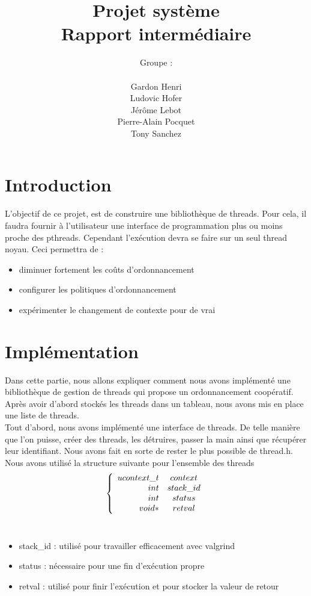 \documentclass{article}
\author{Groupe :\\ \\Gardon Henri\\Ludovic Hofer\\Jérôme Lebot\\Pierre-Alain Pocquet\\Tony Sanchez}
\title{Projet système \\ Rapport intermédiaire}
\begin{document}
\maketitle

\section*{Introduction}
 
 L'objectif de ce projet, est de construire une bibliothèque de threads. Pour
cela, il faudra fournir à l'utilisateur une interface de programmation plus ou
moins proche des pthreads.
 Cependant l'exécution devra se faire sur un seul thread noyau.
 Ceci permettra de :
 \\
 \begin{itemize}
 \item diminuer fortement les coûts d'ordonnancement
 \item configurer les politiques d'ordonnancement
 \item expérimenter le changement de contexte pour de vrai
 \end{itemize}

\section{Implémentation}
 
 	Dans cette partie, nous allons expliquer comment nous avons implémenté une
bibliothèque de gestion de threads qui propose un ordonnancement coopératif.
Après avoir d'abord stockés les threads dans un tableau, nous avons mis en place
une liste de threads.%
 \\
	Tout d'abord, nous avons implémenté une interface de threads. De telle manière
que l'on puisse, créer des threads, les détruires, passer la main ainsi que
récupérer leur identifiant. Nous avons fait en sorte de rester le plus possible
de thread.h. 
\\
Nous avons utilisé la structure suivante pour l'ensemble des threads
\\
\[
\left\{
\begin{array}{r c }
ucontext\_t &context\\
int &stack\_id\\
int & status\\
void* & retval
\end{array}
\right.
\]
\\
\begin{itemize}
\item stack\_id : utilisé pour travailler efficacement avec valgrind
\item status : nécessaire pour une fin d'exécution propre
\item retval : utilisé pour finir l'exécution et pour stocker la valeur de
  retour
\end{itemize}
\end{document}
